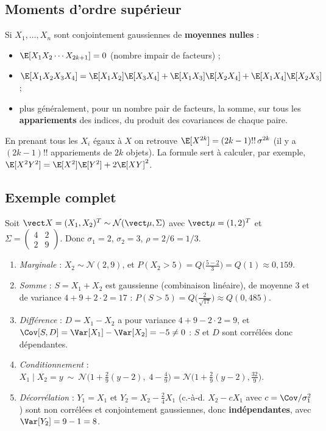 \documentclass[11pt,a4paper,openany]{book}
\begin{document}
\subsection{Moments d'ordre supérieur}

\begin{propbox}[title={Formule d'Isserlis (Wick)}]
Si $X_1,\dots,X_n$ sont conjointement gaussiennes de \textbf{moyennes nulles} :
\begin{itemize}
\item $\E[X_1X_2\cdots X_{2k+1}] = 0$ (nombre impair de facteurs) ;
\item $\E[X_1X_2X_3X_4] = \E[X_1X_2]\E[X_3X_4] + \E[X_1X_3]\E[X_2X_4] + \E[X_1X_4]\E[X_2X_3]$ ;
\item plus généralement, pour un nombre pair de facteurs, la somme, sur tous les
  \textbf{appariements} des indices, du produit des covariances de chaque paire.
\end{itemize}
En prenant tous les $X_i$ égaux à $X$ on retrouve $\E[X^{2k}] = (2k-1)!!\,\sigma^{2k}$ (il y a
$(2k-1)!!$ appariements de $2k$ objets). La formule sert à calculer, par exemple, $\E[X^2Y^2] =
\E[X^2]\E[Y^2] + 2\E[XY]^2$.
\end{propbox}

\subsection{Exemple complet}

\begin{exbox}[title={Calculs avec un couple gaussien}]
Soit $\vect X = (X_1,X_2)^T \sim \mathcal{N}(\vect\mu,\Sigma)$ avec $\vect\mu = (1,2)^T$ et
$\Sigma = \begin{pmatrix}4&2\\2&9\end{pmatrix}$. Donc $\sigma_1=2$, $\sigma_2=3$,
$\rho = 2/6 = 1/3$.
\begin{enumerate}
\item \emph{Marginale} : $X_2 \sim \mathcal{N}(2, 9)$, et $P(X_2>5) = Q\big(\frac{5-2}{3}\big) =
  Q(1)\approx 0{,}159$.
\item \emph{Somme} : $S = X_1+X_2$ est gaussienne (combinaison linéaire), de moyenne $3$ et de
  variance $4+9+2\cdot2 = 17$ : $P(S>5) = Q\big(\frac{2}{\sqrt{17}}\big)\approx Q(0{,}485)$.
\item \emph{Différence} : $D = X_1 - X_2$ a pour variance $4+9-2\cdot 2 = 9$, et $\Cov[S,D] =
  \Var[X_1]-\Var[X_2] = -5 \neq 0$ : $S$ et $D$ sont corrélées donc dépendantes.
\item \emph{Conditionnement} : $X_1\mid X_2 = y\ \sim\ \mathcal{N}\big(1 + \tfrac{2}{9}(y-2),\;
  4 - \tfrac{4}{9}\big) = \mathcal{N}\big(1+\tfrac29(y-2),\tfrac{32}{9}\big)$.
\item \emph{Décorrélation} : $Y_1 = X_1$ et $Y_2 = X_2 - \tfrac{2}{4}X_1$ (c.-à-d. $X_2 - cX_1$
  avec $c = \Cov/\sigma_1^2$) sont non corrélées et conjointement gaussiennes, donc
  \textbf{indépendantes}, avec $\Var[Y_2] = 9 - 1 = 8$.
\end{enumerate}
\end{exbox}
\end{document}
